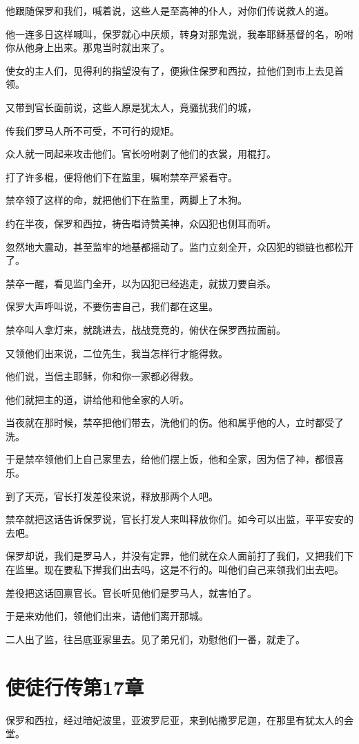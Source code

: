 \documentclass[12pt,oneside]{book}
\begin{document}
他跟随保罗和我们，喊着说，这些人是至高神的仆人，对你们传说救人的道。

他一连多日这样喊叫，保罗就心中厌烦，转身对那鬼说，我奉耶稣基督的名，吩咐你从他身上出来。那鬼当时就出来了。

使女的主人们，见得利的指望没有了，便揪住保罗和西拉，拉他们到市上去见首领。

又带到官长面前说，这些人原是犹太人，竟骚扰我们的城，

传我们罗马人所不可受，不可行的规矩。

众人就一同起来攻击他们。官长吩咐剥了他们的衣裳，用棍打。

打了许多棍，便将他们下在监里，嘱咐禁卒严紧看守。

禁卒领了这样的命，就把他们下在监里，两脚上了木狗。

约在半夜，保罗和西拉，祷告唱诗赞美神，众囚犯也侧耳而听。

忽然地大震动，甚至监牢的地基都摇动了。监门立刻全开，众囚犯的锁链也都松开了。

禁卒一醒，看见监门全开，以为囚犯已经逃走，就拔刀要自杀。

保罗大声呼叫说，不要伤害自己，我们都在这里。

禁卒叫人拿灯来，就跳进去，战战竞竞的，俯伏在保罗西拉面前。

又领他们出来说，二位先生，我当怎样行才能得救。

他们说，当信主耶稣，你和你一家都必得救。

他们就把主的道，讲给他和他全家的人听。

当夜就在那时候，禁卒把他们带去，洗他们的伤。他和属乎他的人，立时都受了洗。

于是禁卒领他们上自己家里去，给他们摆上饭，他和全家，因为信了神，都很喜乐。

到了天亮，官长打发差役来说，释放那两个人吧。

禁卒就把这话告诉保罗说，官长打发人来叫释放你们。如今可以出监，平平安安的去吧。

保罗却说，我们是罗马人，并没有定罪，他们就在众人面前打了我们，又把我们下在监里。现在要私下撵我们出去吗，这是不行的。叫他们自己来领我们出去吧。

差役把这话回禀官长。官长听见他们是罗马人，就害怕了。

于是来劝他们，领他们出来，请他们离开那城。

二人出了监，往吕底亚家里去。见了弟兄们，劝慰他们一番，就走了。

\chapter{使徒行传第17章}
保罗和西拉，经过暗妃波里，亚波罗尼亚，来到帖撒罗尼迦，在那里有犹太人的会堂。
\end{document}
